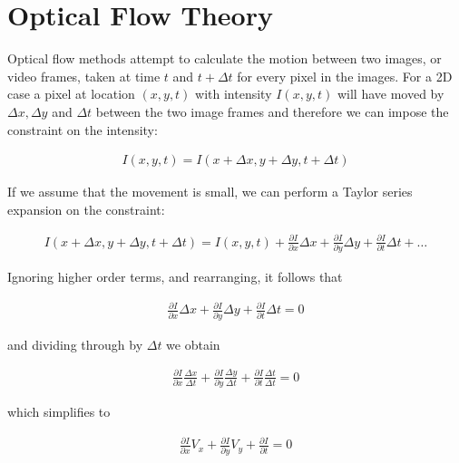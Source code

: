\chapter{Optical Flow Theory}
\label{sec:theory}

\ifpdf
    \graphicspath{{Section2/Figs/Raster/}{Section2/Figs/PDF/}{Section2/Figs/}}
\else
    \graphicspath{{Section2/Figs/Vector/}{Section2/Figs/}}
\fi

Optical flow methods attempt to calculate the motion between two images, or video frames, taken at time $t$ and $t + \Delta t$ for every pixel in the images. For a 2D case a pixel at location $(x, y, t)$ with intensity $I(x, y, t)$ will have moved by $\Delta x, \Delta y$ and $\Delta t$ between the two image frames and therefore we can impose the constraint on the intensity:

\begin{align*}
  I(x, y, t) = I(x + \Delta x, y + \Delta y, t + \Delta t)
\end{align*}

If we assume that the movement is small, we can perform a Taylor series expansion on the constraint:

\begin{align*}
  I(x + \Delta x, y + \Delta y, t + \Delta t) = I(x, y, t) + \frac{\partial I}{\partial x}\Delta x+\frac{\partial I}{\partial y}\Delta y+\frac{\partial I}{\partial t}\Delta t + \dots
\end{align*}

Ignoring higher order terms, and rearranging, it follows that

\begin{align*}
  \frac{\partial I}{\partial x}\Delta x+\frac{\partial I}{\partial y}\Delta y+\frac{\partial I}{\partial t}\Delta t = 0
\end{align*}

and dividing through by $\Delta t$ we obtain

\begin{align*}
  \frac{\partial I}{\partial x}\frac{\Delta x}{\Delta t}+\frac{\partial I}{\partial y}\frac{\Delta y}{\Delta t}+\frac{\partial I}{\partial t}\frac{\Delta t}{\Delta t} = 0
\end{align*}

which simplifies to

\begin{align*}
  \frac{\partial I}{\partial x}V_x+\frac{\partial I}{\partial y}V_y+\frac{\partial I}{\partial t} = 0
\end{align*}

